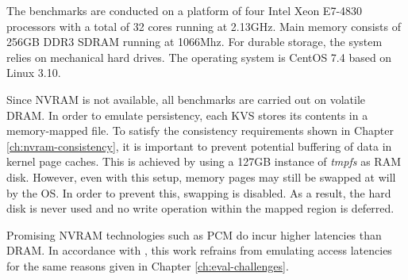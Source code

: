 The benchmarks are conducted on a platform of four Intel Xeon E7-4830 processors
with a total of 32 cores running at 2.13GHz. Main memory consists of 256GB DDR3
SDRAM running at 1066Mhz. For durable storage, the system relies on mechanical
hard drives. The operating system is CentOS 7.4 based on Linux 3.10.

Since NVRAM is not available, all benchmarks are carried out on volatile DRAM.
In order to emulate persistency, each KVS stores its contents in a memory-mapped
file. To satisfy the consistency requirements shown in Chapter
\ref{ch:nvram-consistency}, it is important to prevent potential buffering of
data in kernel page caches. This is achieved by using a 127GB instance of
\emph{tmpfs} as RAM disk. However, even with this setup, memory pages may still
be swapped at will by the OS. In order to prevent this, swapping is disabled. As
a result, the hard disk is never used and no write operation within the mapped
region is deferred.

Promising NVRAM technologies such as PCM do incur higher latencies than DRAM. In
accordance with \cite{bailey2013exploring, zhou2016nvht}, this work refrains
from emulating access latencies for the same reasons given in Chapter
\ref{ch:eval-challenges}.
